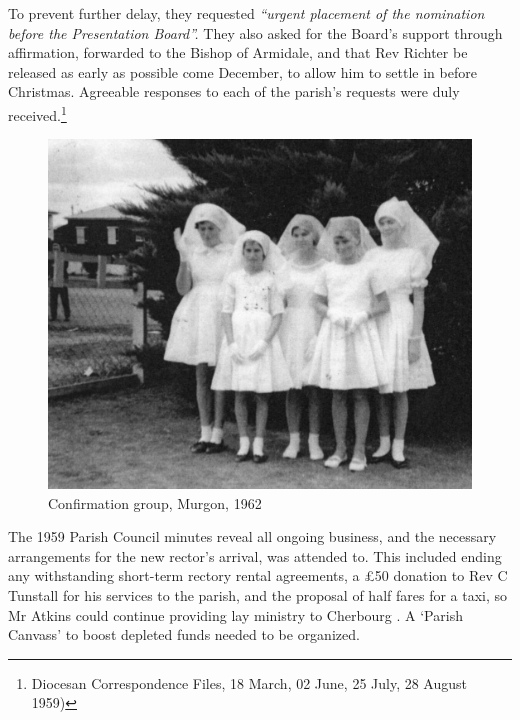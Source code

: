 To prevent further delay, they requested \emph{``urgent placement of the nomination before the Presentation Board''.} They also asked for the Board's support through affirmation, forwarded to the Bishop of Armidale, and that Rev Richter be released as early as possible come December, to allow him to settle in before Christmas. Agreeable responses to each of the parish's requests were duly received.\footnote{Diocesan Correspondence Files, 18 March, 02 June, 25 July, 28 August 1959)}








\begin{figure}
\begin{center}
\includegraphics[width=1.\linewidth,center]{../images/confirmation1962.jpg}
\caption{Confirmation group, Murgon, 1962}
\end{center}
\end{figure}




The 1959 Parish Council minutes reveal all ongoing business, and the necessary arrangements for the new rector's arrival, was attended to. This included ending any withstanding short-term rectory rental agreements, a \pounds50 donation to Rev C Tunstall for his services to the parish, and the proposal of half fares for a taxi, so Mr Atkins could continue providing lay ministry to Cherbourg . A `Parish Canvass' to boost depleted funds needed to be organized.




